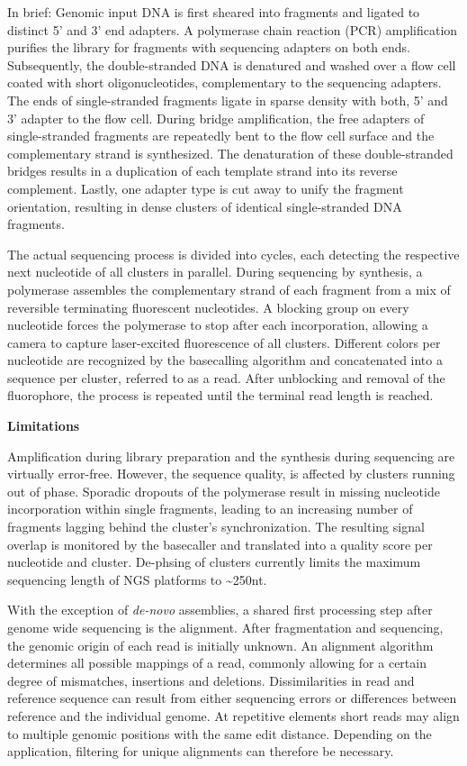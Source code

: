 In brief: Genomic input DNA is first sheared into fragments and ligated to distinct 5' and 3' end adapters.
A polymerase chain reaction (PCR) amplification purifies the library for fragments with sequencing adapters on both ends.
Subsequently, the double-stranded DNA is denatured and washed over a flow cell coated with short oligonucleotides, complementary to the sequencing adapters.
The ends of single-stranded fragments ligate in sparse density with both, 5' and 3' adapter to the flow cell.
During bridge amplification, the free adapters of single-stranded fragments are repeatedly bent to the flow cell surface and the complementary strand is synthesized. 
The denaturation of these double-stranded bridges results in a duplication of each template strand into its reverse complement.
Lastly, one adapter type is cut away to unify the fragment orientation, resulting in dense clusters of identical single-stranded DNA fragments.

The actual sequencing process is divided into cycles, each detecting the respective next nucleotide of all clusters in parallel.
During sequencing by synthesis, a polymerase assembles the complementary strand of each fragment from a mix of reversible terminating fluorescent nucleotides.
A blocking group on every nucleotide forces the polymerase to stop after each incorporation, allowing a camera to capture laser-excited fluorescence of all clusters.
Different colors per nucleotide are recognized by the basecalling algorithm and concatenated into a sequence per cluster, referred to as a read.
After unblocking and removal of the fluorophore, the process is repeated until the terminal read length is reached.

\textbf{Limitations}

Amplification during library preparation and the synthesis during sequencing are virtually error-free.
However, the sequence quality, is affected by clusters running out of phase. 
Sporadic dropouts of the polymerase result in missing nucleotide incorporation within single fragments, leading to an increasing number of fragments lagging behind the cluster's synchronization.
The resulting signal overlap is monitored by the basecaller and translated into a quality score per nucleotide and cluster.
De-phsing of clusters currently limits the maximum sequencing length of NGS platforms to \textasciitilde250nt.

With the exception of \textit{de-novo} assemblies, a shared first processing step after genome wide sequencing is the alignment.
After fragmentation and sequencing, the genomic origin of each read is initially unknown.
An alignment algorithm determines all possible mappings of a read, commonly allowing for a certain degree of mismatches, insertions and deletions.
Dissimilarities in read and reference sequence can result from either sequencing errors or differences between reference and the individual genome.
At repetitive elements short reads may align to multiple genomic positions with the same edit distance.
Depending on the application, filtering for unique alignments can therefore be necessary.

